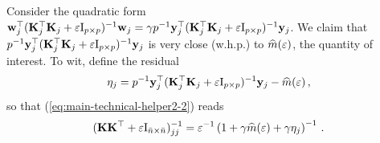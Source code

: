 \documentclass[times,sort&compress,3p]{elsarticle}
\begin{document}
Consider
the quadratic form ${\bf w}_j^\top ({\bf K}_j^\top {\bf K}_j + \varepsilon\mathrm{I}_{p \times p})^{-1}{\bf w}_j = \gamma p^{-1}{\bf y}_j^\top ({\bf K}_j^\top {\bf K}_j + \varepsilon\mathrm{I}_{p \times p})^{-1}{\bf y}_j$. 
We claim that $p^{-1}{\bf y}_j^\top ({\bf K}_j^\top {\bf K}_j + \varepsilon\mathrm{I}_{p \times p})^{-1}{\bf y}_j$ is very close (w.h.p.) to $\widehat{m}(\varepsilon)$, the quantity of interest. To wit, define the residual
\begin{equation}
    \eta_j = p^{-1}{\bf y}_j^\top ({\bf K}_j^\top {\bf K}_j + \varepsilon\mathrm{I}_{p \times p})^{-1}{\bf y}_j - \widehat{m}(\varepsilon) \,,
\end{equation}
so that (\ref{eq:main-technical-helper2-2}) reads
\begin{equation}\label{eq:main-technical-helper2-3}
    ({\bf K}{\bf K}^\top  +\varepsilon\mathrm{I}_{\bar{n} \times \bar{n}} )^{-1}_{jj} = \varepsilon^{-1}\left(1 + \gamma \widehat{m}(\varepsilon) + \gamma\eta_j \right)^{-1} \,.
\end{equation}
\end{document}
